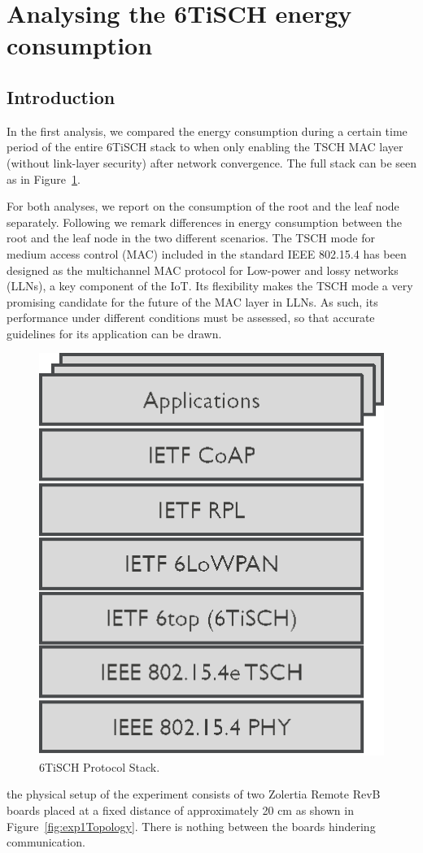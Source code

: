 \documentclass[conference]{IEEEtran}
\newcommand{\figref}[1]{Figure~\ref{#1}}
\renewcommand\_{\textunderscore\allowbreak}
\begin{document}
\section{Analysing the 6TiSCH energy consumption}
\label{section:task1}

\subsection{Introduction} 
\label{section:t1_intro}
In the first analysis, we compared the energy consumption during a certain time period of the entire 6TiSCH stack to when only enabling the TSCH MAC layer (without link-layer security) after network convergence.
The full stack can be seen as in \figref{fig:6tischStack}.


For both analyses, we report on the consumption of the root and the leaf node separately.
Following we remark differences in energy consumption between the root and the leaf node in the two different scenarios.
The TSCH mode for medium access control (MAC) included in the standard IEEE 802.15.4 has been designed as the multichannel MAC protocol for Low-power and lossy networks (LLNs), a key component of the IoT. Its ﬂexibility makes the TSCH mode a very promising candidate for the future of the MAC layer in LLNs. As such, its performance under different conditions must be assessed, so that accurate guidelines for its application can be drawn\cite{TSCHExperimentEval}.
\begin{figure}[htbp]
	\centering
	\includegraphics[width=.25\textwidth,keepaspectratio]{figures/6TiSCH-Protocol-Stack.png}
	\caption{6TiSCH Protocol Stack\cite{TimeCritical6tisch}.}
	\label{fig:6tischStack}
\end{figure}


the physical setup of the experiment consists of two Zolertia  Remote RevB boards placed at a fixed distance of approximately 20 cm as shown in \figref{fig:exp1Topology}. There is nothing between the boards hindering communication.
\end{document}
